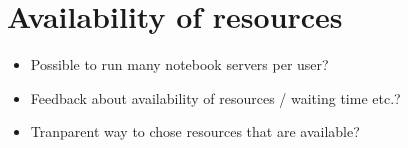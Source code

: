 
\section{Availability of resources}
\label{s-availability-resources}

\begin{itemize}
  \item Possible to run many notebook servers per user?
  \item Feedback about availability of resources / waiting time etc.?
  \item Tranparent way to chose resources that are available?
\end{itemize}
